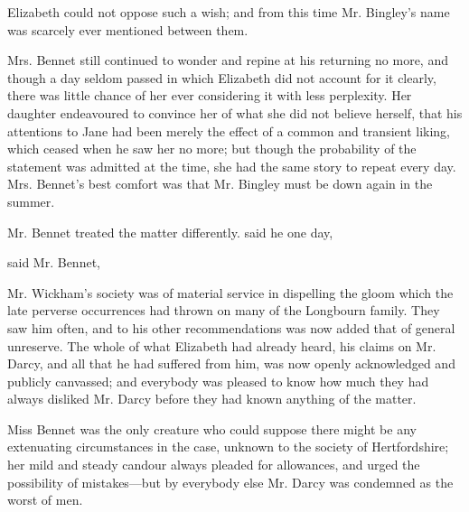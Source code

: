Elizabeth could not oppose such a wish; and from this time Mr. Bingley's name was scarcely ever mentioned between them.

Mrs. Bennet still continued to wonder and repine at his returning no more, and though a day seldom passed in which Elizabeth did not account for it clearly, there was little chance of her ever considering it with less perplexity. Her daughter endeavoured to convince her of what she did not believe herself, that his attentions to Jane had been merely the effect of a common and transient liking, which ceased when he saw her no more; but though the probability of the statement was admitted at the time, she had the same story to repeat every day. Mrs. Bennet's best comfort was that Mr. Bingley must be down again in the summer.

Mr. Bennet treated the matter differently.  said he one day, 


 said Mr. Bennet, 

Mr. Wickham's society was of material service in dispelling the gloom which the late perverse occurrences had thrown on many of the Longbourn family. They saw him often, and to his other recommendations was now added that of general unreserve. The whole of what Elizabeth had already heard, his claims on Mr. Darcy, and all that he had suffered from him, was now openly acknowledged and publicly canvassed; and everybody was pleased to know how much they had always disliked Mr. Darcy before they had known anything of the matter.

Miss Bennet was the only creature who could suppose there might be any extenuating circumstances in the case, unknown to the society of Hertfordshire; her mild and steady candour always pleaded for allowances, and urged the possibility of mistakes---but by everybody else Mr. Darcy was condemned as the worst of men.

